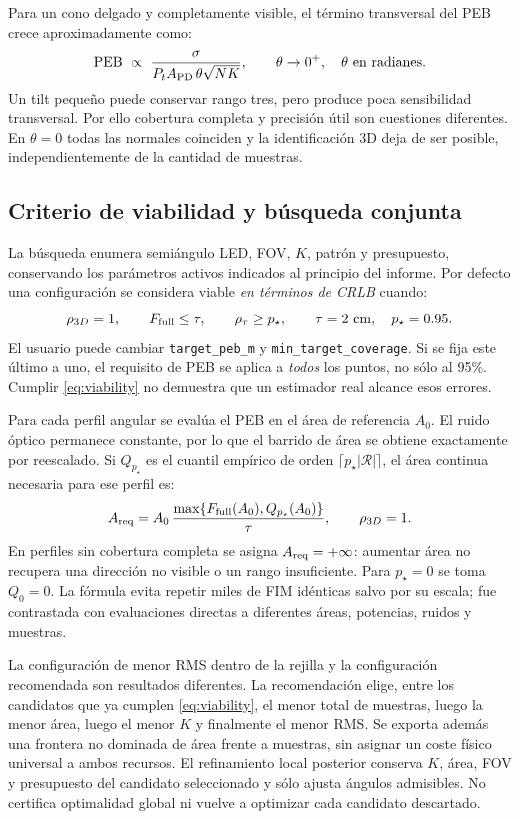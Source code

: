 \documentclass[11pt,a4paper]{article}
\newcommand{\PEB}{\operatorname{PEB}}
\begin{document}
Para un cono delgado y completamente visible, el término transversal del PEB crece aproximadamente como:
\begin{equation}
\PEB\ \propto\ \frac{\sigma}{P_t A_{\rm PD}\,\theta\sqrt{NK}},\qquad \theta\to0^+,\quad\theta\text{ en radianes}.
\end{equation}
Un tilt pequeño puede conservar rango tres, pero produce poca sensibilidad transversal. Por ello cobertura completa y precisión útil son cuestiones diferentes. En $\theta=0$ todas las normales coinciden y la identificación 3D deja de ser posible, independientemente de la cantidad de muestras.

\subsection{Criterio de viabilidad y búsqueda conjunta}
La búsqueda enumera semiángulo LED, FOV, $K$, patrón y presupuesto, conservando los parámetros activos indicados al principio del informe. Por defecto una configuración se considera viable \emph{en términos de CRLB} cuando:
\begin{equation}
\rho_{3D}=1,\qquad F_{\rm full}\leq\tau,\qquad\rho_\tau\geq p_\star,
\qquad \tau=2\ \mathrm{cm},\quad p_\star=0.95.
\label{eq:viability}
\end{equation}
El usuario puede cambiar \texttt{target\_peb\_m} y \texttt{min\_target\_coverage}. Si se fija este último a uno, el requisito de PEB se aplica a \emph{todos} los puntos, no sólo al 95\%. Cumplir \eqref{eq:viability} no demuestra que un estimador real alcance esos errores.

Para cada perfil angular se evalúa el PEB en el área de referencia $A_0$. El ruido óptico permanece constante, por lo que el barrido de área se obtiene exactamente por reescalado. Si $Q_{p_\star}$ es el cuantil empírico de orden $\lceil p_\star|\mathcal R|\rceil$, el área continua necesaria para ese perfil es:
\begin{equation}
A_{\rm req}=A_0\,\frac{\max\{F_{\rm full}(A_0),Q_{p_\star}(A_0)\}}{\tau},\qquad \rho_{3D}=1.
\label{eq:required_area}
\end{equation}
En perfiles sin cobertura completa se asigna $A_{\rm req}=+\infty$: aumentar área no recupera una dirección no visible o un rango insuficiente. Para $p_\star=0$ se toma $Q_0=0$. La fórmula evita repetir miles de FIM idénticas salvo por su escala; fue contrastada con evaluaciones directas a diferentes áreas, potencias, ruidos y muestras.

La configuración de menor RMS dentro de la rejilla y la configuración recomendada son resultados diferentes. La recomendación elige, entre los candidatos que ya cumplen \eqref{eq:viability}, el menor total de muestras, luego la menor área, luego el menor $K$ y finalmente el menor RMS. Se exporta además una frontera no dominada de área frente a muestras, sin asignar un coste físico universal a ambos recursos. El refinamiento local posterior conserva $K$, área, FOV y presupuesto del candidato seleccionado y sólo ajusta ángulos admisibles. No certifica optimalidad global ni vuelve a optimizar cada candidato descartado.
\end{document}
